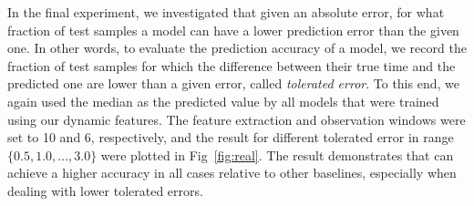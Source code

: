 In the final experiment, we investigated that given an absolute error, for what fraction of test samples a model can have a lower prediction error than the given one. In other words, to evaluate the prediction accuracy of a model, we record the fraction of test samples for which the difference between their true time and the predicted one are lower than a given error, called \emph{tolerated error}. To this end, we again used the median as the predicted value by all models that were trained using our dynamic features. The feature extraction and observation windows were set to 10 and 6, respectively, and the result for different tolerated error in range $\{0.5, 1.0, \dots, 3.0\}$ were plotted in Fig~\ref{fig:real}. The result demonstrates that \npglm can achieve a higher accuracy in all cases relative to other baselines, especially when dealing with lower tolerated errors.

